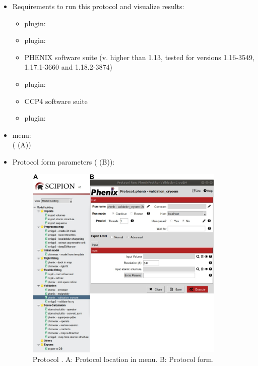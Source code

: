 \begin{itemize}
 \item Requirements to run this protocol and visualize results:
    \begin{itemize}
        \item \scipion plugin: 
        \item \scipion plugin: 
        \item PHENIX software suite (v. higher than 1.13, tested for versions 1.16-3549, 1.17.1-3660 and 1.18.2-3874)
        \item \scipion plugin: 
        \item CCP4 software suite
        \item \scipion plugin: 
    \end{itemize}
 \item \scipion menu:\\
   ( (A))
  
 \item Protocol form parameters ( (B)):
  
    \begin{figure}[H]
     \centering 
     \captionsetup{width=.9\linewidth} 
     \includegraphics[width=0.90\textwidth]{Images_appendix/Fig157}
     \caption{Protocol . A: Protocol location in \scipion menu. B: Protocol form.}
     \label{fig:validationCryoEM_protocol_1}
    \end{figure}
    

\end{itemize}
